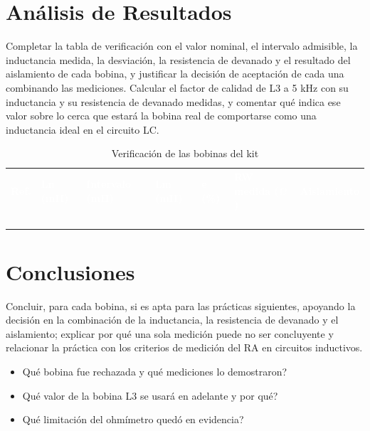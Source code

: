 \documentclass[12pt]{article}
\begin{document}
\section{Análisis de Resultados}\label{sec:analisis}
Completar la tabla de verificación con el valor nominal, el intervalo admisible, la inductancia medida, la desviación, la resistencia de devanado y el resultado del aislamiento de cada bobina, y justificar la decisión de aceptación de cada una combinando las mediciones.
\lineablanco
Calcular el factor de calidad de L3 a 5 kHz con su inductancia y su resistencia de devanado medidas, y comentar qué indica ese valor sobre lo cerca que estará la bobina real de comportarse como una inductancia ideal en el circuito LC.
\begin{table}[H]
  \centering
  \caption{Verificación de las bobinas del kit}
  \label{tab:registro-1}
  \begin{tabularx}{\linewidth}{>{\raggedright\arraybackslash}X>{\raggedright\arraybackslash}X>{\raggedright\arraybackslash}X>{\raggedright\arraybackslash}X>{\raggedright\arraybackslash}X>{\raggedright\arraybackslash}X>{\raggedright\arraybackslash}X}
    \rowcolor{iubnavy} \textcolor{white}{\textbf{Ref.}} & \textcolor{white}{\textbf{Ln (mH)}} & \textcolor{white}{\textbf{Intervalo (mH)}} & \textcolor{white}{\textbf{Lm (mH)}} & \textcolor{white}{\textbf{e (\%)}} & \textcolor{white}{\textbf{RW medida (\ensuremath{\Omega})}} & \textcolor{white}{\textbf{Aislamiento}} \\
    \rule{0pt}{0.8cm} & & & & & & \\
    \rowcolor{iubfondogris} \rule{0pt}{0.8cm} & & & & & & \\
    \rule{0pt}{0.8cm} & & & & & & \\
    \rowcolor{iubfondogris} \rule{0pt}{0.8cm} & & & & & & \\
    \bottomrule
  \end{tabularx}
\end{table}

\section{Conclusiones}\label{sec:conclusiones}
Concluir, para cada bobina, si es apta para las prácticas siguientes, apoyando la decisión en la combinación de la inductancia, la resistencia de devanado y el aislamiento; explicar por qué una sola medición puede no ser concluyente y relacionar la práctica con los criterios de medición del RA en circuitos inductivos.
\lineablanco
\begin{itemize}
  \item \textquestiondown{}Qué bobina fue rechazada y qué mediciones lo demostraron?
  \item \textquestiondown{}Qué valor de la bobina L3 se usará en adelante y por qué?
  \item \textquestiondown{}Qué limitación del ohmímetro quedó en evidencia?
\end{itemize}
\end{document}

